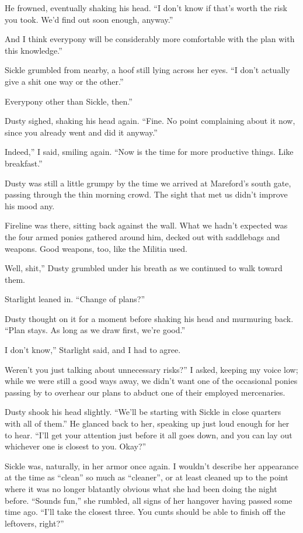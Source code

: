 He frowned, eventually shaking his head. “I don’t know if that’s worth the risk you took. We’d find out soon enough, anyway.”

\leavevmode{}And I think everypony will be considerably more comfortable with the plan with this knowledge.”

Sickle grumbled from nearby, a hoof still lying across her eyes. “I don’t actually give a shit one way or the other.”

\leavevmode{}Everypony other than Sickle, then.”

Dusty sighed, shaking his head again. “Fine. No point complaining about it now, since you already went and did it anyway.”

\leavevmode{}Indeed,” I said, smiling again. “Now is the time for more productive things. Like breakfast.”

{\br}%
Dusty was still a little grumpy by the time we arrived at Mareford’s south gate, passing through the thin morning crowd. The sight that met us didn’t improve his mood any.

Fireline was there, sitting back against the wall. What we hadn’t expected was the four armed ponies gathered around him, decked out with saddlebags and weapons. Good weapons, too, like the Militia used.

\leavevmode{}Well, shit,” Dusty grumbled under his breath as we continued to walk toward them.

Starlight leaned in. “Change of plans?”

Dusty thought on it for a moment before shaking his head and murmuring back. “Plan stays. As long as we draw first, we’re good.”

\leavevmode{}I don’t know,” Starlight said, and I had to agree.

\leavevmode{}Weren’t you just talking about unnecessary risks?” I asked, keeping my voice low; while we were still a good ways away, we didn’t want one of the occasional ponies passing by to overhear our plans to abduct one of their employed mercenaries.

Dusty shook his head slightly. “We’ll be starting with Sickle in close quarters with all of them.” He glanced back to her, speaking up just loud enough for her to hear. “I’ll get your attention just before it all goes down, and you can lay out whichever one is closest to you. Okay?”

Sickle was, naturally, in her armor once again. I wouldn’t describe her appearance at the time as “clean” so much as “cleaner”, or at least cleaned up to the point where it was no longer blatantly obvious what she had been doing the night before. “Sounds fun,” she rumbled, all signs of her hangover having passed some time ago. “I’ll take the closest three. You cunts should be able to finish off the leftovers, right?”

